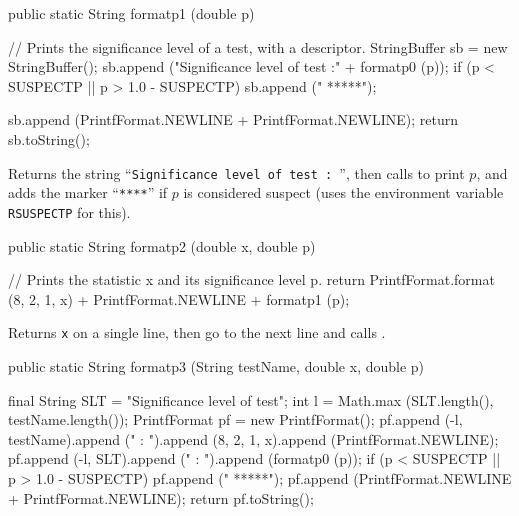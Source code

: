 \begin{htmlonly}
\end{htmlonly}
\begin{code}

   public static String formatp1 (double p)\begin{hide} {
      // Prints the significance level of a test, with a descriptor.
      StringBuffer sb = new StringBuffer();
      sb.append ("Significance level of test            :" + formatp0 (p));
      if (p < SUSPECTP || p > 1.0 - SUSPECTP)
         sb.append ("    *****");

      sb.append (PrintfFormat.NEWLINE + PrintfFormat.NEWLINE);
      return sb.toString();
   }\end{hide}
\end{code}
\begin{tabb}  Returns the string ``\texttt{Significance level of test : }'',
  then calls  to print $p$, and adds
  the marker ``\texttt{****}'' if $p$ is considered suspect
  (uses the environment variable \texttt{RSUSPECTP} for this).
\end{tabb}
\begin{htmlonly}
\end{htmlonly}
\begin{code}

   public static String formatp2 (double x, double p)\begin{hide} {
      // Prints the statistic x and its significance level p.
      return PrintfFormat.format (8, 2, 1, x) + PrintfFormat.NEWLINE +
             formatp1 (p);
   }\end{hide}
\end{code}
\begin{tabb}  Returns \texttt{x} on a single line, then go to the next line
   and calls .
\end{tabb}
\begin{htmlonly}
\end{htmlonly}
\begin{code}

   public static String formatp3 (String testName, double x, double p)\begin{hide} {
      final String SLT = "Significance level of test";
      int l = Math.max (SLT.length(), testName.length());
      PrintfFormat pf = new PrintfFormat();
      pf.append (-l, testName).append (" : ").append (8, 2, 1, x).append
               (PrintfFormat.NEWLINE);
      pf.append (-l, SLT).append (" : ").append (formatp0 (p));
      if (p < SUSPECTP || p > 1.0 - SUSPECTP)
         pf.append ("    *****");
      pf.append (PrintfFormat.NEWLINE + PrintfFormat.NEWLINE);
      return pf.toString();
   }\end{hide}
\end{code}
